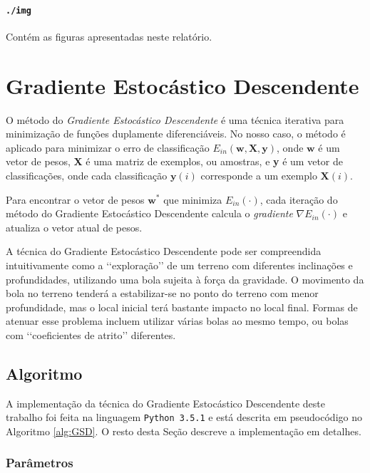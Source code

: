 \documentclass[a4paper, 12pt]{article}
\begin{document}
\paragraph{\texttt{./img}} Contém as figuras apresentadas neste relatório.

\section{Gradiente Estocástico Descendente}

O método do \textit{Gradiente Estocástico Descendente} é uma técnica iterativa
para minimização de funções duplamente diferenciáveis. No nosso caso, o método
é aplicado para minimizar o erro de classificação $E_{in}(\textbf{w},
\textbf{X}, \textbf{y})$, onde $\textbf{w}$ é um vetor de pesos, \textbf{X} é
uma matriz de exemplos, ou amostras, e \textbf{y} é um vetor de classificações,
onde cada classificação $\textbf{y}(i)$ corresponde a um exemplo
$\textbf{X}(i)$.

Para encontrar o vetor de pesos $\textbf{w}^{*}$ que minimiza $E_{in}(\cdot)$,
cada iteração do método do Gradiente Estocástico Descendente calcula o
\textit{gradiente} $\nabla{}E_{in}(\cdot)$ e atualiza o vetor atual de pesos.

A técnica do Gradiente Estocástico Descendente pode ser compreendida
intuitivamente como a \lq\lq{}exploração\rq\rq{} de um terreno com diferentes
inclinações e profundidades, utilizando uma bola sujeita à força da gravidade.
O movimento da bola no terreno tenderá a estabilizar-se no ponto do terreno com
menor profundidade, mas o local inicial terá bastante impacto no local final.
Formas de atenuar esse problema incluem utilizar várias bolas ao mesmo tempo,
ou bolas com \lq\lq{}coeficientes de atrito\rq\rq{} diferentes.

\subsection{Algoritmo}

A implementação da técnica do Gradiente Estocástico Descendente deste trabalho
foi feita na linguagem \texttt{Python 3.5.1} e está descrita em pseudocódigo no
Algoritmo \ref{alg:GSD}. O resto desta Seção descreve a implementação em
detalhes.

\subsubsection{Parâmetros}
\end{document}
